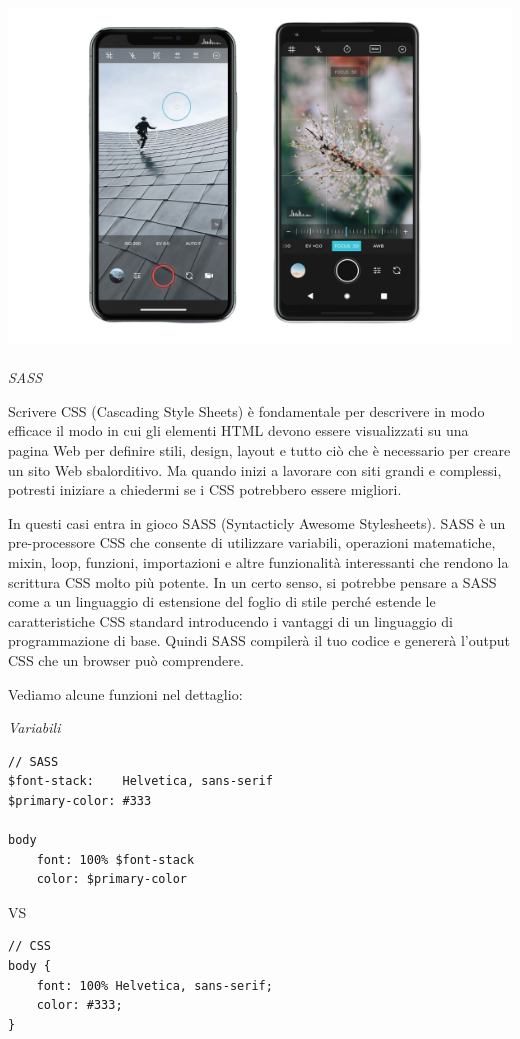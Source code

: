\includegraphics[scale=0.60]{img/cap2/camera}


\paragraph{}
\textit{SASS}

Scrivere CSS (Cascading Style Sheets) è fondamentale per descrivere in modo efficace il modo in cui gli elementi HTML devono 
essere visualizzati su una pagina Web per definire stili, design, layout e tutto ciò che è necessario per creare un sito 
Web sbalorditivo. Ma quando inizi a lavorare con siti grandi e complessi, potresti iniziare a chiedermi se i CSS potrebbero 
essere migliori. 

In questi casi entra in gioco SASS (Syntacticly Awesome Stylesheets).
SASS è un pre-processore CSS che consente di utilizzare variabili, operazioni matematiche, mixin, loop, funzioni, importazioni 
e altre funzionalità interessanti che rendono la scrittura CSS molto più potente. In un certo senso, si potrebbe pensare a 
SASS come a un linguaggio di estensione del foglio di stile perché estende le caratteristiche CSS standard introducendo i
vantaggi di un linguaggio di programmazione di base. Quindi SASS compilerà il tuo codice e genererà l'output CSS che un
browser può comprendere.

Vediamo alcune funzioni nel dettaglio:

\textit{Variabili}
\begin{lstlisting}
// SASS
$font-stack:    Helvetica, sans-serif
$primary-color: #333

body
    font: 100% $font-stack
    color: $primary-color
\end{lstlisting}
VS
\begin{lstlisting}
// CSS
body {
    font: 100% Helvetica, sans-serif;
    color: #333;
} 
\end{lstlisting}
    


